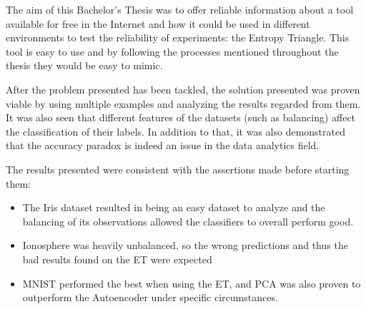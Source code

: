 

The aim of this Bachelor's Thesis was to offer reliable information about a tool available for free in the Internet and how it could be used in different environments to test the reliability of experiments: the Entropy Triangle. This tool is easy to use and by following the processes mentioned throughout the thesis they would be easy to mimic. \par

After the problem presented has been tackled, the solution presented was proven viable by using multiple examples and analyzing the results regarded from them. It was also seen that different features of the datasets (such as balancing) affect the classification of their labels. In addition to that, it was also demonstrated that the accuracy paradox is indeed an issue in the data analytics field.

The results presented were consistent with the assertions made before starting them:
\begin{itemize}
	\item The Iris dataset resulted in being an easy dataset to analyze and the balancing of its observations allowed the classifiers to overall perform good.
	
	\item Ionosphere was heavily unbalanced, so the wrong predictions and thus the bad results found on the ET were expected
	
	\item MNIST performed the best when using the ET, and PCA was also proven to outperform the Autoencoder  under specific circumstances.
	
\end{itemize}


